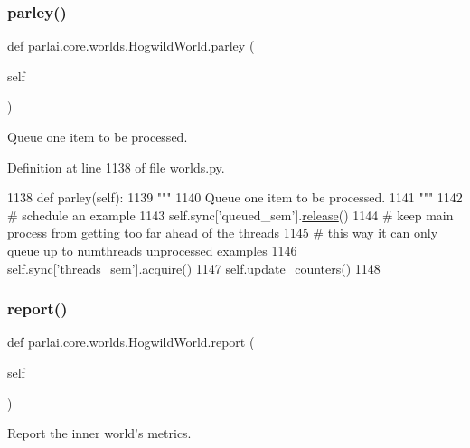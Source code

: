 \subsubsection{\texorpdfstring{parley()}{parley()}}
{\footnotesize\ttfamily def parlai.\+core.\+worlds.\+Hogwild\+World.\+parley (\begin{DoxyParamCaption}\item[{}]{self }\end{DoxyParamCaption})}

\begin{DoxyVerb}Queue one item to be processed.
\end{DoxyVerb}
 

Definition at line 1138 of file worlds.\+py.


\begin{DoxyCode}
1138     \textcolor{keyword}{def }parley(self):
1139         \textcolor{stringliteral}{"""}
1140 \textcolor{stringliteral}{        Queue one item to be processed.}
1141 \textcolor{stringliteral}{        """}
1142         \textcolor{comment}{# schedule an example}
1143         self.sync[\textcolor{stringliteral}{'queued\_sem'}].\hyperlink{namespaceconf_a325dc746d8bf05c54d26351c35a21d90}{release}()
1144         \textcolor{comment}{# keep main process from getting too far ahead of the threads}
1145         \textcolor{comment}{# this way it can only queue up to numthreads unprocessed examples}
1146         self.sync[\textcolor{stringliteral}{'threads\_sem'}].acquire()
1147         self.update\_counters()
1148 
\end{DoxyCode}
\mbox{\label{classparlai_1_1core_1_1worlds_1_1HogwildWorld_a11c6831feb2a54a0d9513b4a514d4097}} 
\subsubsection{\texorpdfstring{report()}{report()}}
{\footnotesize\ttfamily def parlai.\+core.\+worlds.\+Hogwild\+World.\+report (\begin{DoxyParamCaption}\item[{}]{self }\end{DoxyParamCaption})}

\begin{DoxyVerb}Report the inner world's metrics.
\end{DoxyVerb}
 

